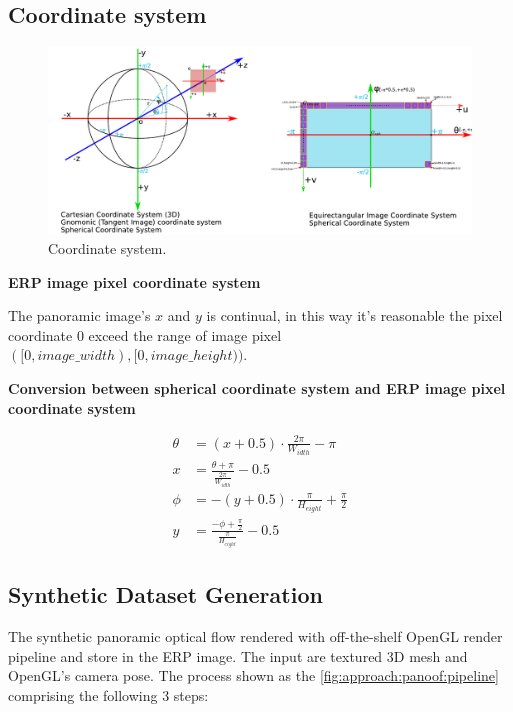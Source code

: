 \subsection{Coordinate system}


\begin{figure}[h]
	\centering
	\includegraphics[width=1.0\linewidth]{images/coordinate_system.pdf}
	\caption{Coordinate system.}
	\label{fig:supp:coordinatesystem}
\end{figure}

\textbf{ERP image pixel coordinate system}

The panoramic image's $x$ and $y$ is continual, in this way it's reasonable the pixel coordinate 0 exceed the range of image pixel $([0, image\_width), [0, image\_height))$. 


\textbf{Conversion between spherical coordinate system and ERP image pixel coordinate system}


\begin{equation}\label{equ:app:sph2erp}
	\begin{split}
		\theta &= (x+0.5) \cdot\frac{2 \pi}{W_{idth}}- \pi
		\\
		x &= \frac{\theta + \pi}{\frac{2\pi}{W_{idth}}} - 0.5
		\\
		\phi&=-(y+0.5) \cdot \frac{\pi}{H_{eight}} + \frac{\pi}{2}
		\\
		y &=\frac{-\phi+\frac{\pi}{2}}{\frac{\pi}{H_{eight}}}-0.5
	\end{split}
\end{equation}


\subsection{Synthetic Dataset Generation}

The synthetic panoramic optical flow rendered with off-the-shelf OpenGL render pipeline and store in the ERP image.
The input are textured 3D mesh and OpenGL's camera pose.
The process shown as the \cref{fig:approach:panoof:pipeline} comprising the following 3 steps:

